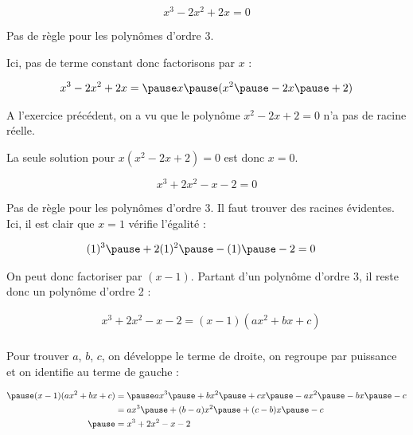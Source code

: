 \documentclass[9pt,professionalfonts,handout,hyperref]{beamer}
\begin{document}
\begin{frame}

$$x^3-2x^2+2x = 0$$

\pause Pas de règle pour les polynômes d'ordre 3.\newline 

\pause Ici, pas de terme constant donc factorisons par $x$ :  

\[\begin{aligned}
&x^3-2x^2+2x =\pause x\pause (x^2\pause -2x\pause +2) \\
\end{aligned}\]

\pause A l'exercice précédent, on a vu que le polynôme $x^2-2x+2 = 0$ n'a pas de racine réelle.\newline 

\pause La seule solution pour $x(x^2-2x+2) = 0$ \pause est donc $x=0$.
	
\end{frame}


\begin{frame}
	
$$x^3+2x^2-x-2 = 0$$
	
\pause Pas de règle pour les polynômes d'ordre 3. \pause Il faut trouver des racines évidentes. \pause Ici, il est clair que $x=1$ vérifie l'égalité :  

\[\begin{aligned}
&(1)^3\pause +2(1)^2\pause -(1)\pause -2 = 0
\end{aligned}\]

On peut donc factoriser par $(x-1)$. \pause Partant d'un polynôme d'ordre 3, il reste donc un polynôme d'ordre 2 : 

\[\begin{aligned}
&x^3+2x^2-x-2 = (x-1)(ax^2+bx+c) \\ 
\end{aligned}\]

\pause Pour trouver $a$, $b$, $c$, on développe le terme de droite, on regroupe par puissance et on identifie au terme de gauche : 

\[\begin{aligned}
\pause (x-1)(ax^2+bx+c) 
&= \pause ax^3\pause +bx^2\pause +cx \pause - ax^2\pause -bx\pause -c\\ 
&= ax^3\pause +(b-a)x^2\pause +(c-b)x \pause -c\\ 
\pause &= x^3+2x^2-x-2\end{aligned}\]

\end{frame}
\end{document}
